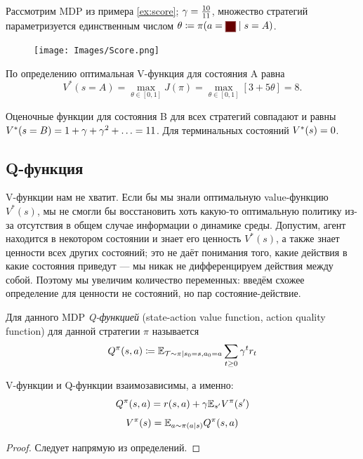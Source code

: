 \begin{example}
Рассмотрим MDP из примера \ref{ex:score}; $\gamma \HM= \frac{10}{11}$, множество стратегий параметризуется единственным числом $\theta \HM\coloneqq \pi(a \HM= \text{\colorsquare{ChadRed}} \HM\mid s \HM= A)$.

\begin{figure}
\centering
\vspace{-0.8cm}
\texttt{[image: Images/Score.png]}
\vspace{-1cm}
\end{figure}

По определению оптимальная V-функция для состояния A равна 
$$V^*(s = A) = \max\limits_{\theta \in [0, 1]} J(\pi) = \max\limits_{\theta \in [0, 1]} \left[ 3 + 5\theta \right] = 8.$$

Оценочные функции для состояния B для всех стратегий совпадают и равны $V^*(s \HM= B) \HM= 1 \HM+ \gamma \HM+ \gamma^2 \HM+ \dots \HM= 11$. Для терминальных состояний $V^*(s) \HM= 0$.
\end{example}

\subsection{Q-функция}

V-функции нам не хватит. Если бы мы знали оптимальную value-функцию $V^*(s)$, мы не смогли бы восстановить хоть какую-то оптимальную политику из-за отсутствия в общем случае информации о динамике среды. Допустим, агент находится в некотором состоянии и знает его ценность $V^*(s)$, а также знает ценности всех других состояний; это не даёт понимания того, какие действия в какие состояния приведут --- мы никак не дифференцируем действия между собой. Поэтому мы увеличим количество переменных: введём схожее определение для ценности не состояний, но пар состояние-действие. 

\begin{definition} 
Для данного MDP \emph{Q-функцией} (state-action value function, action quality function) для данной стратегии $\pi$ называется
$$Q^\pi(s, a) \coloneqq \mathbb{E}_{\mathcal{T} \sim \pi \mid s_0 = s, a_0 = a} \sum_{t \ge 0} \gamma^t r_t$$
\end{definition}

\begin{theorem}
V-функции и Q-функции взаимозависимы, а именно:
\begin{equation}\label{QV}
    Q^\pi(s, a) =  r(s, a) + \gamma \mathbb{E}_{s'} V^\pi(s')
\end{equation}
\begin{equation}\label{VQ}
    V^\pi(s) = \mathbb{E}_{a \sim \pi(a \mid s)} Q^\pi(s, a)
\end{equation}
\begin{proof}
Следует напрямую из определений.
\end{proof}
\end{theorem}

